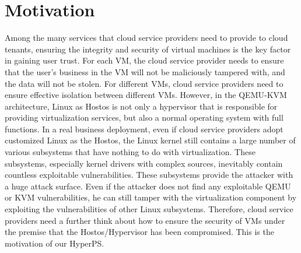 \section{Motivation}%
\label{sec:motivation}
Among the many services that cloud service providers need to provide to cloud tenants, ensuring the integrity and security of virtual machines is the key factor in gaining user trust. For each VM, the cloud service provider needs to ensure that the user's business in the VM will not be maliciously tampered with, and the data will not be stolen. For different VMs, cloud service providers need to ensure effective isolation between different VMs. However, in the QEMU-KVM architecture, Linux as Hostos is not only a hypervisor that is responsible for providing virtualization services, but also a normal operating system with full functions. In a real business deployment, even if cloud service providers adopt customized Linux as the Hostos, the Linux kernel still contains a large number of various subsystems that have nothing to do with virtualization. These subsystems, especially kernel drivers with complex sources, inevitably contain countless exploitable vulnerabilities. These subsystems provide the attacker with a huge attack surface. Even if the attacker does not find any exploitable QEMU or KVM vulnerabilities, he can still tamper with the virtualization component by exploiting the vulnerabilities of other Linux subsystems. Therefore, cloud service providers need a further think about how to ensure the security of VMs under the premise that the Hostos/Hypervisor has been compromised. This is the motivation of our HyperPS.

